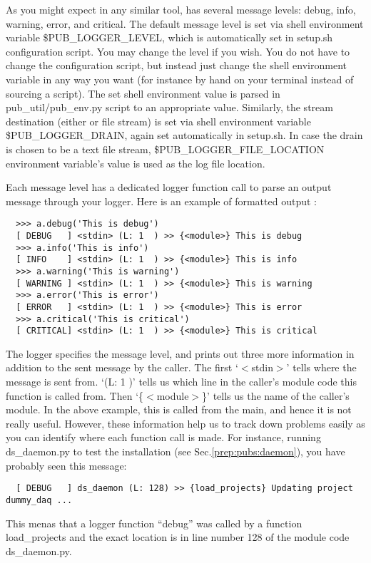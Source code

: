 As you might expect in any similar tool, {\publogger} has several message levels:
debug, info, warning, error, and critical. The default message level is set via
shell environment variable {\ttfamily \$PUB\_LOGGER\_LEVEL}, which is automatically
set in {\ttfamily setup.sh} configuration script. You may change the level if you
wish. You do not have to change the configuration script, but instead just change
the shell environment variable in any way you want (for instance by hand on your
terminal instead of sourcing a script). The set shell environment value is parsed 
in {\ttfamily pub\_util/pub\_env.py} script to an appropriate value. 
Similarly, the stream destination (either {\stdout} or file stream) is
set via shell environment variable {\ttfamily \$PUB\_LOGGER\_DRAIN}, again set
automatically in {\ttfamily setup.sh}. In case the drain is chosen to be a text
file stream, {\ttfamily \$PUB\_LOGGER\_FILE\_LOCATION} environment variable's value
is used as the log file location.

Each message level has a dedicated logger function call to parse an output message
through your logger. Here is an example of formatted output :
\begin{lstlisting}
  >>> a.debug('This is debug')
  [ DEBUG   ] <stdin> (L: 1  ) >> {<module>} This is debug
  >>> a.info('This is info')
  [ INFO    ] <stdin> (L: 1  ) >> {<module>} This is info
  >>> a.warning('This is warning')
  [ WARNING ] <stdin> (L: 1  ) >> {<module>} This is warning
  >>> a.error('This is error')
  [ ERROR   ] <stdin> (L: 1  ) >> {<module>} This is error
  >>> a.critical('This is critical')
  [ CRITICAL] <stdin> (L: 1  ) >> {<module>} This is critical
\end{lstlisting}
The logger specifies the message level, and prints out three more information in
addition to the sent message by the caller. The first `$<$stdin$>$' tells where the
message is sent from. `(L: 1  )' tells us which line in the caller's module code
this function is called from. Then `\{$<$module$>$\}' tells us the name of the
caller's module. In the above example, this is called from the main, and hence
it is not really useful. However, these information help us to track down problems
easily as you can identify where each function call is made. For instance, running
{\ttfamily ds\_daemon.py} to test the installation (see Sec.\ref{prep:pubs:daemon}),
you have probably seen this message:
\begin{lstlisting}
  [ DEBUG   ] ds_daemon (L: 128) >> {load_projects} Updating project dummy_daq ...
\end{lstlisting}
 This menas that a logger function ``debug'' was called by a function 
{\ttfamily load\_projects} and the exact location is in line number 128 of the 
module code {\ttfamily ds\_daemon.py}. 

